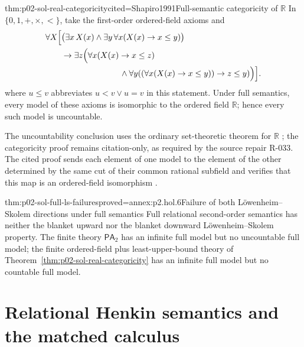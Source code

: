 \begin{hbtheorem}{thm:p02-sol-real-categoricity}{cited=Shapiro1991}{Full-semantic categoricity of \(\mathbb R\)}
In \(\{0,1,+,\times,<\}\), take the first-order ordered-field axioms and
\[
\begin{aligned}
 \forall X\Bigl[&\bigl(\exists x\,X(x)\land
   \exists y\,\forall x(X(x)\to x\leq y)\bigr)\\
 &{}\to \exists z\Bigl(\forall x(X(x)\to x\leq z)\\
 &\hspace{25mm}{}\land
   \forall y((\forall x(X(x)\to x\leq y))\to z\leq y)\Bigr)\Bigr].
\end{aligned}
\]
where \(u\leq v\) abbreviates \(u<v\lor u=v\) in this statement.  Under
full semantics, every model of these axioms is isomorphic to the ordered field
\(\mathbb R\); hence every such model is uncountable.
\end{hbtheorem}

The uncountability conclusion uses the ordinary set-theoretic theorem for
\(\mathbb R\) \cite{Jech2003}; the categoricity proof remains citation-only,
as required by the source repair R-033.  The cited proof sends each element of
one model to the element of the other determined by the same cut of their
common rational subfield and verifies that this map is an ordered-field
isomorphism \cite{Shapiro1991}.

\begin{hbcorollary}{thm:p02-sol-full-ls-failures}{proved=annex:p2.hol.6}{Failure of both L\"owenheim--Skolem directions under full semantics}
Full relational second-order semantics has neither the blanket upward nor the
blanket downward L\"owenheim--Skolem property.  The finite theory
\(\mathsf{PA}_2\) has an infinite full model but no uncountable full model;
the finite ordered-field plus least-upper-bound theory of
Theorem~\ref{thm:p02-sol-real-categoricity} has an infinite full model but no
countable full model.
\end{hbcorollary}

\section[Relational Henkin semantics]{Relational Henkin semantics and the matched calculus}
\label{sec:p02-sol-henkin-semantics}

